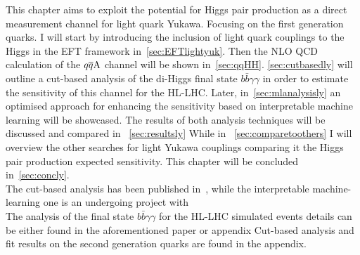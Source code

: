 This chapter aims to exploit the potential for Higgs pair production as a direct measurement channel for light quark Yukawa. Focusing on the first generation quarks.  I will start by introducing the inclusion of light quark couplings to the Higgs in the EFT framework in~\autoref{sec:EFTlightyuk}. Then the NLO QCD calculation of the $q\overline q \rm A$ channel will be shown in~\autoref{sec:qqHH}. \autoref{sec:cutbasedly} will outline a cut-based analysis of the di-Higgs final state $ b \bar b \gamma \gamma$ in order to estimate the sensitivity of this channel for the HL-LHC. Later, in~\autoref{sec:mlanalysisly} an optimised approach for enhancing the sensitivity based on interpretable machine learning will be showcased. The results of both analysis techniques will be discussed and compared in ~\autoref{sec:resultsly} While in ~\autoref{sec:comparetoothers} I will overview  the other searches for light Yukawa couplings comparing it the Higgs pair production expected sensitivity. This chapter will be concluded in~\autoref{sec:concly}. \\ The cut-based analysis has been published in~\cite{Alasfar:2019pmn}, while the interpretable machine-learning one is an undergoing project with \\ The analysis of the final state $b \bar b \gamma \gamma$ for the HL-LHC simulated events details can be either found in the aforementioned paper or appendix Cut-based analysis and fit results on the second generation quarks are found in the appendix. 
